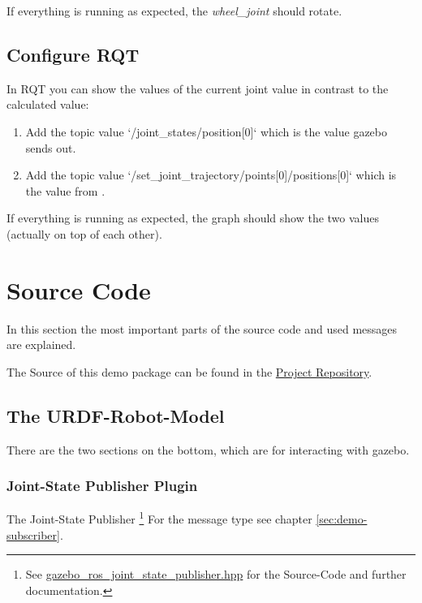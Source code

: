 If everything is running as expected, the \textit{wheel\_joint} should rotate.


\subsection[RQT Config]{Configure RQT} \label{sec:demo-rqt-config}

In RQT you can show the values of the current joint value in contrast to the calculated value:

\begin{enumerate}
    \item Add the topic value `/joint\_states/position[0]` which is the value \Gls{gazebo} sends out.
    \item Add the topic value `/set\_joint\_trajectory/points[0]/positions[0]` which is the value from .
\end{enumerate}

If everything is running as expected, the graph should show the two values (actually on top of each other).


\section[Source]{Source Code} \label{sec:demo-source-code}

In this section the most important parts of the source code and used messages are explained.

The Source of this demo package can be found in the \href{https://github.com/LukyLuke/mse_vt_eeros/}{Project Repository}.

\subsection[URDF-Model]{The URDF-Robot-Model} \label{sec:demo-urdf-model}

There are the two sections on the bottom, which are for interacting with \Gls{gazebo}.

\subsubsection[Joint-State]{Joint-State Publisher Plugin} \label{sec:demo-urdf-model-joint-state}

The Joint-State Publisher \footnote{See \href{https://github.com/ros-simulation/gazebo_ros_pkgs/blob/ros2/gazebo_plugins/include/gazebo_plugins/gazebo_ros_joint_state_publisher.hpp}{gazebo\_ros\_joint\_state\_publisher.hpp} for the Source-Code and further documentation.}
For the message type see chapter \ref{sec:demo-subscriber}.

